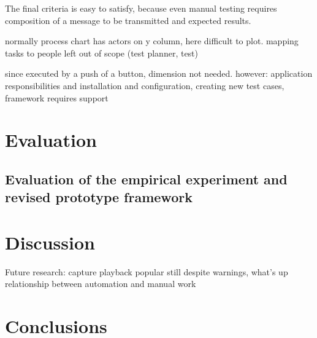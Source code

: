 \documentclass[12pt,a4paper,oneside,pdftex]{report}
\begin{document}
{{The final criteria is easy to satisfy, because even manual testing requires composition of a message to be transmitted and expected results.

normally process chart has actors on y column, here difficult to plot. mapping tasks to people left out of scope (test planner, test) 

since executed by a push of a button, dimension not needed. however: application responsibilities and installation and configuration, creating new test cases, framework requires support

\chapter{Evaluation}
\label{chapter:evaluation}

\section{Evaluation of the empirical experiment and revised prototype framework}

\chapter{Discussion}
\label{chapter:discussion}

Future research:
capture playback popular still despite warnings, what's up
relationship between automation and manual work


\chapter{Conclusions}
\label{chapter:conclusions}

\begin{comment}
Inconsistent interpretation of parameters or values
Violations of value domains or of capacity or size limits
Side-effects on parameters or resrouces
Missing or misunderstood functionality
Nonfinctional problems
Dynamic mismatches
\end{comment}

\begin{comment}
Interpretation
    wrong function - something else than specified
    extra function - more than what is expected/needed
    missing function - not all that is specified
Miscoded call (error which causes the developer to place the call instruction at the wrong point in the program)
    Extra instruction fault: the call instruction is on a path which should not have the call.
    Wrong placement fault: the call is at the wrong location on the path which should have the call instruction.
    Missing instruction fault: the call instruction is missing on the path which should have the call.
Interface error
    When stardards or agreements are violated
\end{comment}

}}
\end{document}
